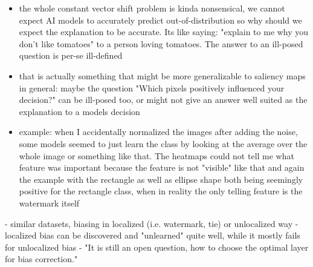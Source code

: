 {\begin{itemize}
    \item the whole constant vector shift problem is kinda nonsensical, we cannot expect AI models to accurately predict out-of-distribution so why should we expect the explanation to be accurate. Its like saying: "explain to me why you don't like tomatoes" to a person loving tomatoes. The answer to an ill-posed question is per-se ill-defined
    \item that is actually something that might be more generalizable to saliency maps in general: maybe the question "Which pixels positively influenced your decision?" can be ill-posed too, or might not give an answer well suited as the explanation to a models decision
    \item example: when I accidentally normalized the images after adding the noise, some models seemed to just learn the class by looking at the average over the whole image or something like that. The heatmaps could not tell me what feature was important because the feature is not "visible" like that
    and again the example with the rectangle as well as ellipse shape both being seemingly positive for the rectangle class, when in reality the only telling feature is the watermark itself
\end{itemize}

\cite{Dreyer2023a}
- similar datasets, biasing in localized (i.e. watermark, tie) or unlocalized way
- localized bias can be discovered and "unlearned" quite well, while it mostly fails for unlocalized bias
- "It is still an open question, how to choose the optimal layer for bias correction."
}

